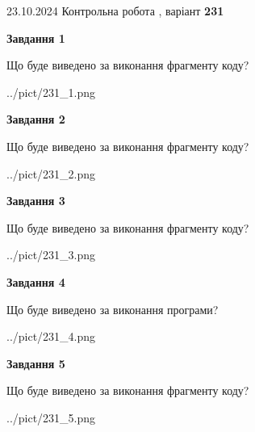\documentclass[12pt, ukrainian]{article}
\begin{document}
{\Large{23.10.2024 Контрольна робота , варіант  \No \textbf { 231 }\par}}
{
\begin {large}
{\begin {center}\textbf{Завдання 1}\end {center}}

Що буде виведено за виконання фрагменту коду?\par
\begin{center}
	{../pict/231_1.png}
\end{center}
\newpage

{\begin {center}\textbf{Завдання 2}\end {center}}

Що буде виведено за виконання фрагменту коду?\par
\begin{center}
	{../pict/231_2.png}
\end{center}
\newpage

{\begin {center}\textbf{Завдання 3}\end {center}}

Що буде виведено за виконання фрагменту коду?\par
\begin{center}
	{../pict/231_3.png}
\end{center}
\newpage

{\begin {center}\textbf{Завдання 4}\end {center}}

Що буде виведено за виконання програми?\par
\begin{center}
	{../pict/231_4.png}
\end{center}
\newpage

{\begin {center}\textbf{Завдання 5}\end {center}}

Що буде виведено за виконання фрагменту коду?\par
\begin{center}
	{../pict/231_5.png}
\end{center}
\newpage


\end{large}}
\end{document}
